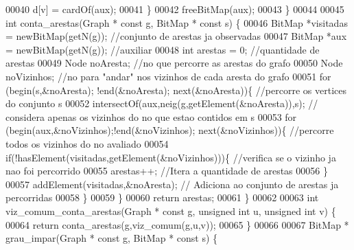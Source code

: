 \begin{DoxyCode}
00040                 d[v] = cardOf(aux);
00041         \}
00042         freeBitMap(aux);
00043 \}
00044 
00045 \textcolor{keywordtype}{int} conta_arestas(Graph * \textcolor{keyword}{const} g, BitMap * \textcolor{keyword}{const} s) \{
00046         BitMap *visitadas = newBitMap(getN(g));         \textcolor{comment}{//conjunto de arestas ja observadas}
00047         BitMap *aux = newBitMap(getN(g));                       \textcolor{comment}{//auxiliar}
00048     \textcolor{keywordtype}{int} arestas = 0;                                                    \textcolor{comment}{//quantidade  de arestas}
00049     Node noAresta;                                                                      \textcolor{comment}{//no que percorre
       as arestas do grafo}
00050     Node noVizinhos;                                                            \textcolor{comment}{//no para "andar" nos
       vizinhos de cada aresta do grafo}
00051                 \textcolor{keywordflow}{for} (begin(s,&noAresta); !end(&noAresta); next(&noAresta))\{             \textcolor{comment}{//percorre os
       vertices do conjunto s}
00052                         intersectOf(aux,neig(g,getElement(&noAresta)),s);                               \textcolor{comment}{//
      considera apenas os vizinhos do no que estao contidos em s}
00053                   \textcolor{keywordflow}{for} (begin(aux,&noVizinhos);!end(&noVizinhos); next(&noVizinhos))\{     \textcolor{comment}{//percorre todos
       os vizinhos do no avaliado}
00054                     \textcolor{keywordflow}{if}(!hasElement(visitadas,getElement(&noVizinhos)))\{                 \textcolor{comment}{//verifica se o
       vizinho ja nao foi percorrido}
00055                       arestas++;                                                                                \textcolor{comment}{
      //Itera a quantidade de arestas  }
00056                         \}
00057         addElement(visitadas,&noAresta);                                                                \textcolor{comment}{//
      Adiciona ao conjunto de arestas ja percorridas}
00058                 \}
00059         \}
00060     \textcolor{keywordflow}{return} arestas;
00061 \}
00062 
00063 \textcolor{keywordtype}{int} viz_comum_conta_arestas(Graph * \textcolor{keyword}{const} g, \textcolor{keywordtype}{unsigned} \textcolor{keywordtype}{int} u, \textcolor{keywordtype}{unsigned} \textcolor{keywordtype}{int} v) \{
00064         \textcolor{keywordflow}{return} conta_arestas(g,viz_comum(g,u,v));
00065 \}
00066 
00067 BitMap * grau_impar(Graph * \textcolor{keyword}{const} g, BitMap * \textcolor{keyword}{const} s) \{

\end{DoxyCode}
